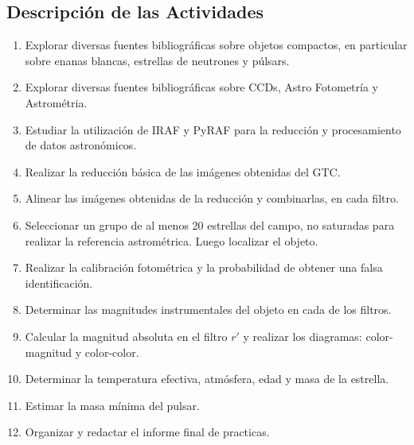 \documentclass[12pt,spanish,letterpage, twoside, openright]{article}
\begin{document}
\subsection{Descripción de las Actividades}
\begin{enumerate}
    \item Explorar diversas fuentes bibliográficas sobre objetos compactos, en particular sobre enanas blancas, estrellas de neutrones y púlsars.
    \item Explorar diversas fuentes bibliográficas sobre CCDs, Astro Fotometría y Astrométria.
    \item Estudiar la utilización de IRAF y PyRAF para la reducción y procesamiento de datos astronómicos.
    \item Realizar la reducción básica de las imágenes obtenidas del GTC.
    \item Alinear las imágenes obtenidas de la reducción y combinarlas, en cada filtro.
    \item Seleccionar un grupo de al menos 20 estrellas del campo, no saturadas para realizar la referencia astrométrica. Luego localizar el objeto.
    \item Realizar la calibración fotométrica y la probabilidad de obtener una falsa identificación.
    \item Determinar las magnitudes instrumentales del objeto en cada de los filtros.
    \item Calcular la magnitud absoluta en el filtro $r'$ y realizar los diagramas: color-magnitud y color-color.
    \item Determinar la temperatura efectiva, atmósfera, edad y masa de la estrella.
    \item Estimar la masa mínima del pulsar.
    \item Organizar y redactar el informe final de practicas.
    
\end{enumerate}


\newpage
\setlength{\parskip}{0mm}


\end{document}
